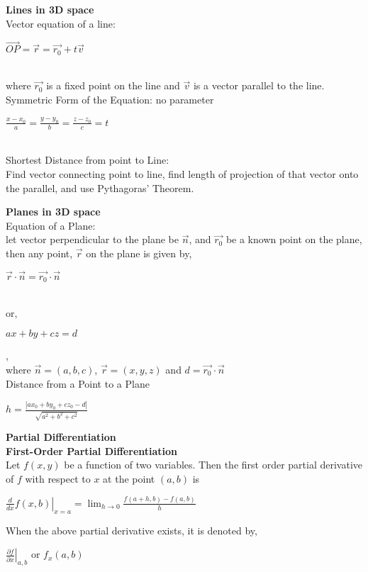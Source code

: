 \documentclass[10pt, a4paper]{article}
\begin{document}
\begin{multicols*}{3}
	\textbf{Lines in 3D space}\\
	Vector equation of a line:\\
	\centerline{$\overrightarrow{OP} = \overrightarrow{r} = \overrightarrow{r_0} + t\overrightarrow{v}$}\\
	where $\overrightarrow{r_0}$ is a fixed point on the line and $\overrightarrow{v}$ is a vector parallel to the line. \\
	
	Symmetric Form of the Equation: no parameter\\
	\centerline{$ \frac{x - x_0}{a} = \frac{y - y_0}{b} = \frac{z - z_0}{c} = t$}\\
	
	Shortest Distance from point to Line:\\
	Find vector connecting point to line, find length of projection of that vector onto the parallel, and use Pythagoras' Theorem.
	
	\textbf{Planes in 3D space}\\
	Equation of a Plane:\\
	let vector perpendicular to the plane be $\overrightarrow{n}$, and $\overrightarrow{r_0}$ be a known point on the plane, then any point, $\overrightarrow{r}$ on the plane is given by,\\
	\centerline{$\overrightarrow{r} \cdot \overrightarrow{n} = \overrightarrow{r_0} \cdot \overrightarrow{n}$}\\
	or, \\
	\centerline{$ax + by + cz = d$}, \\where $\overrightarrow{n} = (a, b, c)$, $\overrightarrow{r} = (x, y, z)$ and $d = \overrightarrow{r_0} \cdot \overrightarrow{n}$\\
	
	Distance from a Point to a Plane\\
	\centerline{$h = \frac{| ax_0 + by_0 + cz_0 - d|}{\sqrt{a^2 + b^2 + c^2}}$}
	
	{\normalsize\textbf{Partial Differentiation}}\\
	\textbf{First-Order Partial Differentiation}\\
	Let $f(x, y)$ be a function of two variables. Then the first order partial derivative of $f$ with respect to $x$ at the point $(a, b)$ is
	\centerline{$\left.\frac{d}{dx} f(x, b) \right\vert_{x = a} = \lim_{h \to 0}\frac{f(a + h, b) -f(a, b)}{h} $}
	When the above partial derivative exists, it is denoted by,\\
	\centerline{$\left .\frac{\partial f}{\partial x}\right\vert_{a, b}$ or $f_x(a, b)$}\\
	

\end{multicols*}
\end{document}
